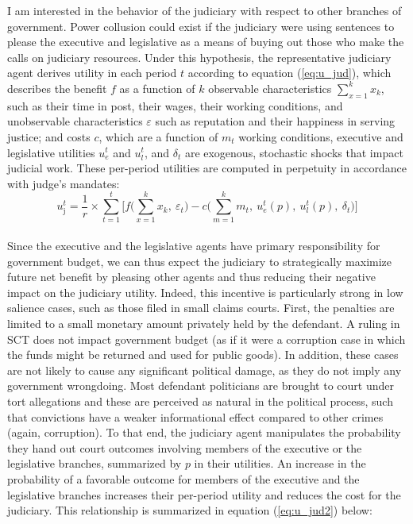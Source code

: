 \documentclass[11pt]{article}
\newcommand{\refp}[1]{(\ref{#1})}
\begin{document}
I am interested in the behavior of the judiciary with respect to other branches of government. Power collusion could exist if the judiciary were using sentences to please the executive and legislative as a means of buying out those who make the calls on judiciary resources. Under this hypothesis, the representative judiciary agent derives utility in each period $t$ according to equation \refp{eq:u_jud}, which describes the benefit $f$ as a function of $k$ observable characteristics $\sum_{x = 1}^{k}x_{k}$, such as their time in post, their wages, their working conditions, and unobservable characteristics $\varepsilon$ such as reputation and their happiness in serving justice; and costs $c$, which are a function of $m_{t}$ working conditions, executive and legislative utilities $u_{e}^{t}$ and $u_{l}^{t}$, and $\delta_{t}$ are exogenous, stochastic shocks that impact judicial work. These per-period utilities are computed in perpetuity in accordance with judge's mandates: \\

\begin{equation} \label{eq:u_jud}
  u_{\text{j}}^{t} = \frac{1}{r} \times \sum_{t = 1}^{t} \Bigg[ f\Big(\sum_{x = 1}^{k}x_{k}, \ \varepsilon_{t} \Big) - c\Big(\sum_{m = 1}^{k} m_{t}, \ u_{e}^{t}(p), \ u_{l}^{t}(p), \ \delta_{t}\Big) \Bigg]
\end{equation} \\

Since the executive and the legislative agents have primary responsibility for government budget, we can thus expect the judiciary to strategically maximize future net benefit by pleasing other agents and thus reducing their negative impact on the judiciary utility. Indeed, this incentive is particularly strong in low salience cases, such as those filed in small claims courts. First, the penalties are limited to a small monetary amount privately held by the defendant. A ruling in SCT does not impact government budget (as if it were a corruption case in which the funds might be returned and used for public goods). In addition, these cases are not likely to cause any significant political damage, as they do not imply any government wrongdoing. Most defendant politicians are brought to court under tort allegations and these are perceived as natural in the political process, such that convictions have a weaker informational effect compared to other crimes (again, corruption). To that end, the judiciary agent manipulates the probability they hand out court outcomes involving members of the executive or the legislative branches, summarized by $p$ in their utilities. An increase in the probability of a favorable outcome for members of the executive and the legislative branches increases their per-period utility and reduces the cost for the judiciary. This relationship is summarized in equation \refp{eq:u_jud2} below: \\
\end{document}
